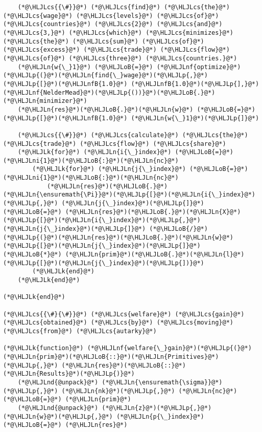 \documentclass[12pt,a4paper]{article}
\newcommand{\HLJLk}[1]{\textcolor[RGB]{148,91,176}{\textbf{#1}}}
\newcommand{\HLJLn}[1]{#1}
\newcommand{\HLJLnd}[1]{\textcolor[RGB]{214,102,97}{#1}}
\newcommand{\HLJLnf}[1]{\textcolor[RGB]{66,102,213}{#1}}
\newcommand{\HLJLnfB}[1]{\textcolor[RGB]{59,151,46}{#1}}
\newcommand{\HLJLni}[1]{\textcolor[RGB]{59,151,46}{#1}}
\newcommand{\HLJLoB}[1]{\textcolor[RGB]{102,102,102}{\textbf{#1}}}
\newcommand{\HLJLp}[1]{#1}
\newcommand{\HLJLcs}[1]{\textcolor[RGB]{153,153,119}{\textit{#1}}}
\begin{document}
\begin{lstlisting}
    (*@\HLJLcs{{\#}}@*) (*@\HLJLcs{find}@*) (*@\HLJLcs{the}@*) (*@\HLJLcs{wage}@*) (*@\HLJLcs{levels}@*) (*@\HLJLcs{of}@*) (*@\HLJLcs{countries}@*) (*@\HLJLcs{2}@*) (*@\HLJLcs{and}@*) (*@\HLJLcs{3,}@*) (*@\HLJLcs{which}@*) (*@\HLJLcs{minimizes}@*) (*@\HLJLcs{the}@*) (*@\HLJLcs{sum}@*) (*@\HLJLcs{of}@*) (*@\HLJLcs{excess}@*) (*@\HLJLcs{trade}@*) (*@\HLJLcs{flow}@*) (*@\HLJLcs{of}@*) (*@\HLJLcs{three}@*) (*@\HLJLcs{countries.}@*)
    (*@\HLJLn{w{\_}1}@*) (*@\HLJLoB{=}@*) (*@\HLJLnf{optimize}@*)(*@\HLJLp{(}@*)(*@\HLJLn{find{\_}wage}@*)(*@\HLJLp{,}@*) (*@\HLJLp{[}@*)(*@\HLJLnfB{1.0}@*) (*@\HLJLnfB{1.0}@*)(*@\HLJLp{],}@*) (*@\HLJLnf{NelderMead}@*)(*@\HLJLp{())}@*)(*@\HLJLoB{.}@*)(*@\HLJLn{minimizer}@*)
    (*@\HLJLn{res}@*)(*@\HLJLoB{.}@*)(*@\HLJLn{w}@*) (*@\HLJLoB{=}@*) (*@\HLJLp{[}@*)(*@\HLJLnfB{1.0}@*) (*@\HLJLn{w{\_}1}@*)(*@\HLJLp{]}@*)

    (*@\HLJLcs{{\#}}@*) (*@\HLJLcs{calculate}@*) (*@\HLJLcs{the}@*) (*@\HLJLcs{trade}@*) (*@\HLJLcs{flow}@*) (*@\HLJLcs{share}@*)
    (*@\HLJLk{for}@*) (*@\HLJLn{i{\_}index}@*) (*@\HLJLoB{=}@*) (*@\HLJLni{1}@*)(*@\HLJLoB{:}@*)(*@\HLJLn{nc}@*)
        (*@\HLJLk{for}@*) (*@\HLJLn{j{\_}index}@*) (*@\HLJLoB{=}@*) (*@\HLJLni{1}@*)(*@\HLJLoB{:}@*)(*@\HLJLn{nc}@*)
            (*@\HLJLn{res}@*)(*@\HLJLoB{.}@*)(*@\HLJLn{\ensuremath{\Pi}}@*)(*@\HLJLp{[}@*)(*@\HLJLn{i{\_}index}@*)(*@\HLJLp{,}@*) (*@\HLJLn{j{\_}index}@*)(*@\HLJLp{]}@*) (*@\HLJLoB{=}@*) (*@\HLJLn{res}@*)(*@\HLJLoB{.}@*)(*@\HLJLn{X}@*)(*@\HLJLp{[}@*)(*@\HLJLn{i{\_}index}@*)(*@\HLJLp{,}@*) (*@\HLJLn{j{\_}index}@*)(*@\HLJLp{]}@*) (*@\HLJLoB{/}@*) (*@\HLJLp{(}@*)(*@\HLJLn{res}@*)(*@\HLJLoB{.}@*)(*@\HLJLn{w}@*)(*@\HLJLp{[}@*)(*@\HLJLn{j{\_}index}@*)(*@\HLJLp{]}@*) (*@\HLJLoB{*}@*) (*@\HLJLn{prim}@*)(*@\HLJLoB{.}@*)(*@\HLJLn{l}@*)(*@\HLJLp{[}@*)(*@\HLJLn{j{\_}index}@*)(*@\HLJLp{])}@*)
        (*@\HLJLk{end}@*)
    (*@\HLJLk{end}@*)

(*@\HLJLk{end}@*)

(*@\HLJLcs{{\#}{\#}}@*) (*@\HLJLcs{welfare}@*) (*@\HLJLcs{gain}@*) (*@\HLJLcs{obtained}@*) (*@\HLJLcs{by}@*) (*@\HLJLcs{moving}@*) (*@\HLJLcs{from}@*) (*@\HLJLcs{autarky}@*)

(*@\HLJLk{function}@*) (*@\HLJLnf{welfare{\_}gain}@*)(*@\HLJLp{(}@*)(*@\HLJLn{prim}@*)(*@\HLJLoB{::}@*)(*@\HLJLn{Primitives}@*)(*@\HLJLp{,}@*) (*@\HLJLn{res}@*)(*@\HLJLoB{::}@*)(*@\HLJLn{Results}@*)(*@\HLJLp{)}@*)
    (*@\HLJLnd{@unpack}@*) (*@\HLJLn{\ensuremath{\sigma}}@*)(*@\HLJLp{,}@*) (*@\HLJLn{nk}@*)(*@\HLJLp{,}@*) (*@\HLJLn{nc}@*) (*@\HLJLoB{=}@*) (*@\HLJLn{prim}@*)
    (*@\HLJLnd{@unpack}@*) (*@\HLJLn{z}@*)(*@\HLJLp{,}@*) (*@\HLJLn{w}@*)(*@\HLJLp{,}@*) (*@\HLJLn{p{\_}index}@*) (*@\HLJLoB{=}@*) (*@\HLJLn{res}@*)


\end{lstlisting}
\end{document}
